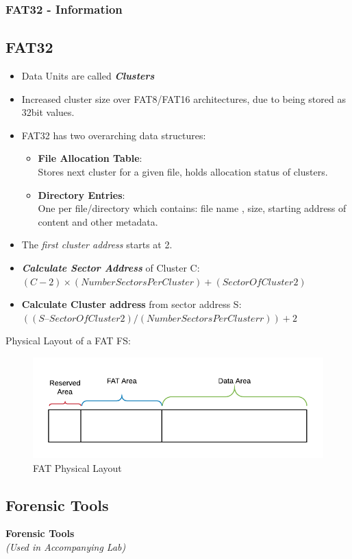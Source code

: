 \documentclass{beamer}
\begin{document}
\begin{frame}[allowframebreaks]
	\frametitle{FAT32 - Information}
	\subsection*{FAT32}
	\begin{itemize}
		\item Data Units are called \textbf{\textit{Clusters}}
		\item Increased cluster size over FAT8/FAT16 architectures, due to being stored as 32bit values.
		\item FAT32 has two overarching data structures:
			\begin{itemize}
				\item \textbf{File Allocation Table}: \\
				Stores next cluster for a given file, holds allocation status of clusters.
				\item \textbf{Directory Entries}:\\
				One per file/directory which contains: file name , size, starting address of content and other metadata.
			\end{itemize}
		\item The \textit{first cluster address} starts at 2. 
		\item \textbf{\textit{Calculate Sector Address}} of Cluster C:\\ 
			$(C-2)\times (NumberSectorsPerCluster) + (SectorOfCluster2)$
		\item \textbf{Calculate Cluster address} from sector address S:\\
			$((S – SectorOfCluster2) / (NumberSectorsPerClusterr)) + 2$
	\end{itemize}
	\newpage
	Physical Layout of a FAT FS:
	\begin{figure}
		\includegraphics[scale=0.8]{fat-phys-layout}
		\caption{FAT Physical Layout}
		\label{fig:fat-phys-layout}
	\end{figure}
\end{frame}
\begin{frame}%
	\section{Forensic Tools}
	\begin{center}
		\Huge\textbf{Forensic Tools}\\
		\large\textit{(Used in Accompanying Lab)}
	\end{center}
\end{frame}
\end{document}
